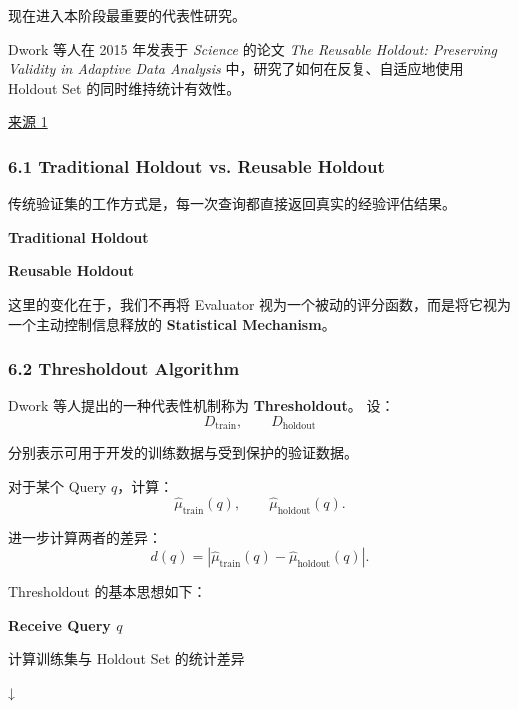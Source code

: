 现在进入本阶段最重要的代表性研究。

Dwork 等人在 2015 年发表于 \emph{Science} 的论文 \emph{The Reusable Holdout: Preserving Validity in Adaptive Data Analysis} 中，研究了如何在反复、自适应地使用 Holdout Set 的同时维持统计有效性。

\href{https://pubmed.ncbi.nlm.nih.gov/26250683/}{来源 1}

\hypertarget{part-2-20-0001-traditional-holdout-vs.-reusable-holdout}{%
\subsubsection{6.1 Traditional Holdout vs. Reusable Holdout}\label{part-2-20-0001-traditional-holdout-vs.-reusable-holdout}}

传统验证集的工作方式是，每一次查询都直接返回真实的经验评估结果。

\textbf{Traditional Holdout}


\textbf{Reusable Holdout}


这里的变化在于，我们不再将 Evaluator 视为一个被动的评分函数，而是将它视为一个主动控制信息释放的 \textbf{Statistical Mechanism}。

\hypertarget{part-2-20-0001-thresholdout-algorithm}{%
\subsubsection{6.2 Thresholdout Algorithm}\label{part-2-20-0001-thresholdout-algorithm}}

Dwork 等人提出的一种代表性机制称为 \textbf{Thresholdout}。 设：
\[D_{\mathrm{train}},\qquad D_{\mathrm{holdout}}\]

分别表示可用于开发的训练数据与受到保护的验证数据。

对于某个 Query \(q\)，计算：
\[\widehat\mu_{\mathrm{train}}(q),
\qquad
\widehat\mu_{\mathrm{holdout}}(q).\]

进一步计算两者的差异：
\[d(q)=
\left|
\widehat\mu_{\mathrm{train}}(q)
-
\widehat\mu_{\mathrm{holdout}}(q)
\right|.\]

Thresholdout 的基本思想如下：

\textbf{Receive Query \(q\)}

计算训练集与 Holdout Set 的统计差异

↓


